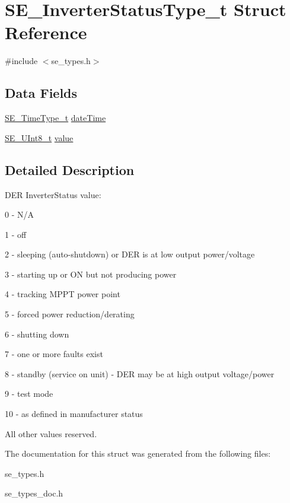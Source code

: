 \hypertarget{structSE__InverterStatusType__t}{}\section{S\+E\+\_\+\+Inverter\+Status\+Type\+\_\+t Struct Reference}
\label{structSE__InverterStatusType__t}


{\ttfamily \#include $<$se\+\_\+types.\+h$>$}

\subsection*{Data Fields}
\begin{DoxyCompactItemize}
\item 
\hyperlink{group__TimeType_ga6fba87a5b57829b4ff3f0e7638156682}{S\+E\+\_\+\+Time\+Type\+\_\+t} \hyperlink{group__InverterStatusType_ga87657492474108fe3e58f3e8ac2a5e8d}{date\+Time}
\item 
\hyperlink{group__UInt8_gaf7c365a1acfe204e3a67c16ed44572f5}{S\+E\+\_\+\+U\+Int8\+\_\+t} \hyperlink{group__InverterStatusType_ga2e5ea03a4944948d5ab06b26e1be0bd3}{value}
\end{DoxyCompactItemize}


\subsection{Detailed Description}
D\+ER Inverter\+Status value\+:

0 -\/ N/A

1 -\/ off

2 -\/ sleeping (auto-\/shutdown) or D\+ER is at low output power/voltage

3 -\/ starting up or ON but not producing power

4 -\/ tracking M\+P\+PT power point

5 -\/ forced power reduction/derating

6 -\/ shutting down

7 -\/ one or more faults exist

8 -\/ standby (service on unit) -\/ D\+ER may be at high output voltage/power

9 -\/ test mode

10 -\/ as defined in manufacturer status

All other values reserved. 

The documentation for this struct was generated from the following files\+:\begin{DoxyCompactItemize}
\item 
se\+\_\+types.\+h\item 
se\+\_\+types\+\_\+doc.\+h\end{DoxyCompactItemize}
